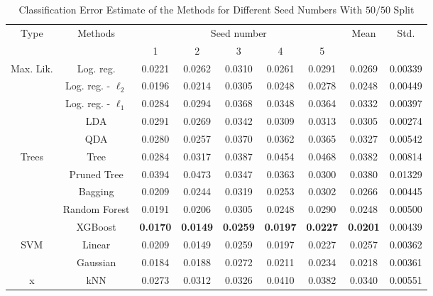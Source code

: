 \begin{table}[htb]
	\caption{Classification Error Estimate of the Methods for Different Seed Numbers With $50/50$ Split}
	\begin{center}
		\begin{tabular}{@{} c c c  c c c c c c@{}}\toprule
			\multirow{2}{*}{Type} & \multirow{2}{*}{Methods} &  \multicolumn{5}{c}{Seed number}
			& 	\multirow{2}{*}{Mean} & \multirow{2}{*}{Std.} \\
			& & 1 & 2 & 3 & 4 & 5 & & \\
			\midrule
			\multirow{5}{*}{Max. Lik.} & Log. reg. & \num{0.0221} & \num{0.0262} & \num{0.0310} & \num{0.0261} & \num{0.0291} & \num{0.0269} & \num{0.00339} \\
			& Log. reg. - $\ell_2$ & \num{0.0196} & \num{0.0214} & \num{0.0305} & \num{0.0248} & \num{0.0278} & \num{0.0248} & \num{0.00449}\\
			& Log. reg. - $\ell_1$ & \num{0.0284} & \num{0.0294} & \num{0.0368} & \num{0.0348} & \num{0.0364} & \num{0.0332} & \num{0.00397}\\
			& LDA & \num{0.0291} & \num{0.0269} & \num{0.0342} & \num{0.0309} & \num{0.0313} & \num{0.0305} & \num{0.00274}\\
			& QDA & \num{0.0280} & \num{0.0257} & \num{0.0370} & \num{0.0362} & \num{0.0365} & \num{0.0327} & \num{0.00542}\\
			\cmidrule{1-9}
			\multirow{5}{*}{Trees} & Tree & \num{0.0284} & \num{0.0317} & \num{0.0387} & \num{0.0454} & \num{0.0468} & \num{0.0382} & \num{0.00814}\\
			& Pruned Tree & \num{0.0394} & \num{0.0473} & \num{0.0347} & \num{0.0363} & \num{0.0300} & \num{0.0380} & \num{0.01329}\\  
			& Bagging & \num{0.0209} & \num{0.0244} & \num{0.0319} & \num{0.0253} & \num{0.0302} & \num{0.0266} & \num{0.00445}\\
			& Random Forest & \num{0.0191} & \num{0.0206} & \num{0.0305} & \num{0.0248} & \num{0.0290} & \num{0.0248} & \num{0.00500}\\
			& XGBoost & \textbf{\num{0.0170}} & \textbf{\num{0.0149}} & \textbf{\num{0.0259}} & \textbf{\num{0.0197}} & \textbf{\num{0.0227}} & \textbf{\num{0.0201}} & \num{0.00439}\\
			\cmidrule{1-9}
			\multirow{2}{*}{SVM} & Linear & \num{0.0209} & \num{0.0149} & \num{0.0259} & \num{0.0197} & \num{0.0227} & \num{0.0257} & \num{0.00362}\\
			& Gaussian & \num{0.0184} & \num{0.0188} & \num{0.0272} & \num{0.0211} & \num{0.0234} & \num{0.0218} & \num{0.00361}\\
			\cmidrule{1-9}
			x & kNN & \num{0.0273} & \num{0.0312} & \num{0.0326} & \num{0.0410} & \num{0.0382} & \num{0.0340} & \num{0.00551} \\
			\bottomrule
		\end{tabular}
	\end{center}
	\label{tab_res_our_strategy}
\end{table}

